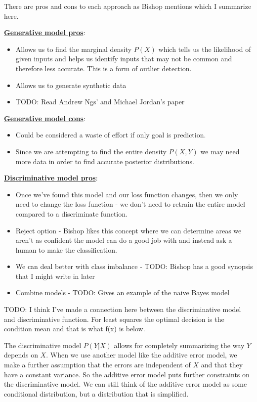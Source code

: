 \documentclass[paper=a4, fontsize=11pt]{scrartcl} %
\numberwithin{equation}{section} %
\numberwithin{figure}{section} %
\numberwithin{table}{section} %
\begin{document}
There are pros and cons to each approach as Bishop mentions which I summarize here.
\break

\noindent \underline{\textbf{Generative model pros}}:
\begin{itemize}
\item Allows us to find the marginal density $P(X)$ which tells us the likelihood of given inputs and helps us identify inputs that may not be common and therefore less accurate. This is a form of outlier detection.
\item Allows us to generate synthetic data
\item TODO: Read Andrew Ngs' and Michael Jordan's paper
\end{itemize}

\noindent \underline{\textbf{Generative model cons}}:
\begin{itemize}
\item Could be considered a waste of effort if only goal is prediction. 
\item Since we are attempting to find the entire density $P(X,Y)$ we may need more data in order to find accurate posterior distributions.
\end{itemize}

\noindent \underline{\textbf{Discriminative model pros}}:
\begin{itemize}
\item Once we've found this model and our loss function changes, then we only need to change the loss function - we don't need to retrain the entire model compared to a discriminate function.
\item Reject option - Bishop likes this concept where we can determine areas we aren't as confident the model can do a good job with and instead ask a human to make the classification.
\item We can deal better with class imbalance - TODO: Bishop has a good synopsis that I might write in later
\item Combine models - TODO: Gives an example of the naive Bayes model
\end{itemize}

TODO: I think I've made a connection here between the discriminative model and discriminative function. For least squares the optimal decision is the condition mean and that is what f(x) is below.

The discriminative model $P(Y|X)$ allows for completely summarizing the way $Y$ depends on $X$. When we use another model like the additive error model, we make a further assumption that the errors are independent of $X$ and that they have a constant variance. So the additive error model puts further constraints on the discriminative model. We can still think of the additive error model as some conditional distribution, but a distribution that is simplified.
\end{document}
